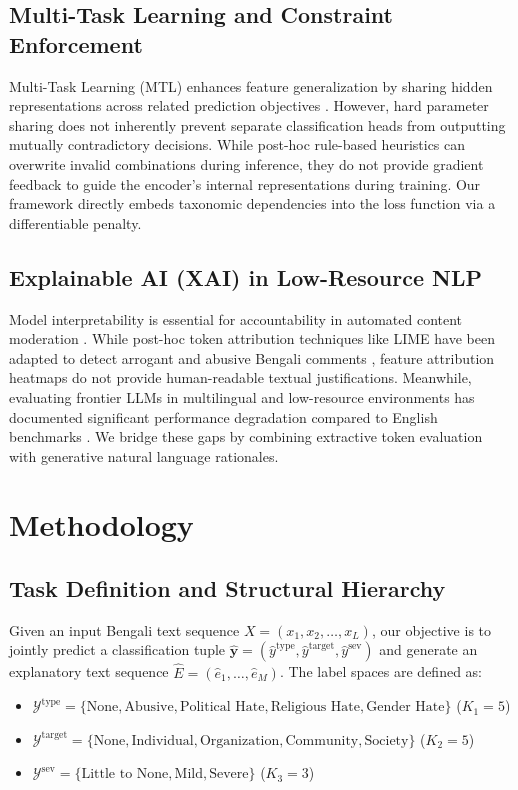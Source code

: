 \documentclass[conference]{IEEEtran}
\begin{document}
\subsection{Multi-Task Learning and Constraint Enforcement}
Multi-Task Learning (MTL) enhances feature generalization by sharing hidden representations across related prediction objectives \cite{caruana1997multitask, liu2019mt}. However, hard parameter sharing does not inherently prevent separate classification heads from outputting mutually contradictory decisions. While post-hoc rule-based heuristics can overwrite invalid combinations during inference, they do not provide gradient feedback to guide the encoder's internal representations during training. Our framework directly embeds taxonomic dependencies into the loss function via a differentiable penalty.

\subsection{Explainable AI (XAI) in Low-Resource NLP}
Model interpretability is essential for accountability in automated content moderation \cite{deyoung2020eraser}. While post-hoc token attribution techniques like LIME \cite{ribeiro2016why} have been adapted to detect arrogant and abusive Bengali comments \cite{ashraf2026arrogant, karim2020deephateexplainer}, feature attribution heatmaps do not provide human-readable textual justifications. Meanwhile, evaluating frontier LLMs in multilingual and low-resource environments has documented significant performance degradation compared to English benchmarks \cite{ahuja2023mega}. We bridge these gaps by combining extractive token evaluation with generative natural language rationales.

\section{Methodology}
\label{sec:method}

\subsection{Task Definition and Structural Hierarchy}
Given an input Bengali text sequence $X = (x_1, x_2, \dots, x_L)$, our objective is to jointly predict a classification tuple $\hat{\mathbf{y}} = (\hat{y}^{\text{type}}, \hat{y}^{\text{target}}, \hat{y}^{\text{sev}})$ and generate an explanatory text sequence $\hat{E} = (\hat{e}_1, \dots, \hat{e}_M)$. The label spaces are defined as:
\begin{itemize}
    \item $\mathcal{Y}^{\text{type}} = \{\text{None}, \text{Abusive}, \text{Political Hate}, \text{Religious Hate}, \text{Gender Hate}\}$ ($K_1 = 5$)
    \item $\mathcal{Y}^{\text{target}} = \{\text{None}, \text{Individual}, \text{Organization}, \text{Community}, \text{Society}\}$ ($K_2 = 5$)
    \item $\mathcal{Y}^{\text{sev}} = \{\text{Little to None}, \text{Mild}, \text{Severe}\}$ ($K_3 = 3$)
\end{itemize}
\end{document}
